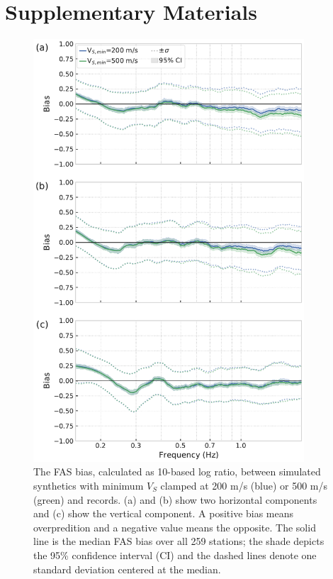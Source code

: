 \setcounter{table}{0}
\setcounter{figure}{0}
\renewcommand{\thetable}{S\arabic{chapter}.\arabic{table}}
\renewcommand{\thefigure}{S\arabic{chapter}.\arabic{figure}}
\newpage
\section*{Supplementary Materials}

\begin{figure}[!ht]
  \centering
  \includegraphics[width=0.9\textwidth,height=0.85\textheight,keepaspectratio]{figures/figure_highf_S1.pdf}
  \caption{
    The FAS bias, calculated as 10-based log ratio, between simulated synthetics with minimum $V_S$ clamped at 200 m/s (blue) or 500 m/s (green) and records. (a) and (b) show two horizontal components and (c) show the vertical component. A positive bias means overpredition and a negative value means the opposite. The solid line is the median FAS bias over all 259 stations; the shade depicts the 95\% confidence interval (CI) and the dashed lines denote one standard deviation centered at the median.
  }
  \label{fig:highf-S1}
\end{figure}
\clearpage

